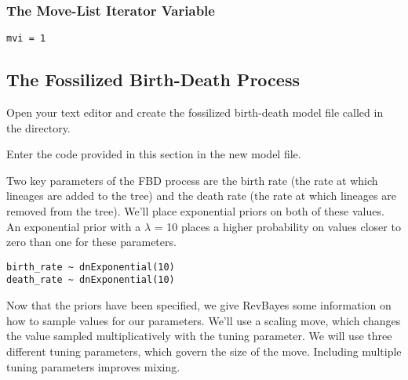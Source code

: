 \medskip
\subsubsection{The Move-List Iterator Variable}\label{subsub:RB-mviVar}




{\tt \begin{snugshade*}
\begin{lstlisting}
mvi = 1
\end{lstlisting}
\end{snugshade*}}

\bigskip

\subsection{The Fossilized Birth-Death Process}\label{subsect:RB-ModelFBD}

{\begin{framed}
Open your text editor and create the fossilized birth-death model file called {\textcolor{red}{}} in the  directory.

Enter the \Rev code provided in this section in the new model file.
\end{framed}}

Two key parameters of the FBD process are the birth rate (the rate at which lineages are added to the tree) and the death rate (the rate at which lineages are removed from the tree). 
We'll place exponential priors on both of these values. 
An exponential prior with a $\lambda$ =  10 places a higher probability on values closer to zero than one for these parameters. 

{\tt \begin{snugshade*}
\begin{lstlisting}
birth_rate ~ dnExponential(10)
death_rate ~ dnExponential(10)
\end{lstlisting}
\end{snugshade*}}

Now that the priors have been specified, we give RevBayes some information on how to sample values for our parameters. 
We'll use a scaling move, which changes the value sampled multiplicatively with the tuning parameter. 
We will use three different tuning parameters, which govern the size of the move. 
Including multiple tuning parameters improves mixing. 

